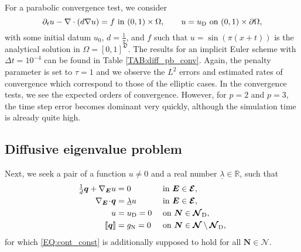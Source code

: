 \documentclass[a4paper, english, 12pt, reqno, draft]{amsart}
\theoremstyle{definition}
\theoremstyle{remark}
\numberwithin{equation}{section}
\newcommand{\SetEdge}{\ensuremath{\boldsymbol{\mathcal E}}}
\newcommand{\SetNode}{\ensuremath{\boldsymbol{\mathcal N}}}
\newcommand{\SetNodeDir}{\ensuremath{\SetNode_\textup D}}
\newcommand{\Edge}{{\ensuremath{\boldsymbol E}}}
\newcommand{\Node}{{\ensuremath{\boldsymbol N}}}
\newcommand{\globDim}{\ensuremath{\mathfrak D}}
\newcommand{\Nabla}{\ensuremath{\nabla_\Edge}}
\newcommand{\Div}{\ensuremath{\Nabla\!\cdot\!}}
\newcommand{\jump}[1]{{[\![ #1 ]\!]}}
\newcommand{\IR}{\ensuremath{\mathbb R}}
\renewcommand{\vec}[1]{\ensuremath{\boldsymbol{#1}}}
\newcommand{\eigenval}{\ensuremath{\underline \lambda}}
\begin{document}
% 
For a parabolic convergence test, we consider
% 
\begin{equation}
 \partial_t u - \nabla \cdot (d \nabla u) = f \text{ in } (0,1) \times \Omega, \qquad u = u_\text D \text{ on } (0,1) \times \partial \Omega,
\end{equation}
% 
with some initial datum $u_0$, $d = \tfrac{1}{\pi}$, and $f$ such that $u = \sin(\pi(x + t))$ is the analytical solution in $\Omega = [0,1]^\globDim$. The results for an implicit Euler scheme with $\Delta t = 10^{-4}$ can be found in Table \ref{TAB:diff_pb_conv}. Again, the penalty parameter is set to $\tau = 1$ and we observe the $L^2$ errors and estimated rates of convergence which correspond to those of the elliptic cases. In the convergence tests, we see the expected orders of convergence. However, for $p=2$ and $p=3$, the time step  error becomes dominant very quickly, although the simulation time is already quite high.
% 
\subsection{Diffusive eigenvalue problem}\label{SEC:diff_eigen}
% 
Next, we seek a pair of a function  $u \neq 0$ and a real number $\eigenval \in \IR$, such that
% 
\begin{subequations}\label{EQ:diffusion_eigen}
\begin{align}
 \tfrac{1}{d} \vec q + \Nabla u & = 0 && \text{ in } \Edge \in \SetEdge,\\
 \Div \vec q & = \eigenval u && \text{ in } \Edge \in \SetEdge,\\
  u & = u_\textup D = 0 && \text{ on } \Node \in \SetNodeDir,\\
 \jump{\vec q} & = g_\textup N = 0 && \text{ on } \Node \in \SetNode \setminus \SetNodeDir,
\end{align}
\end{subequations}
% 
for which \eqref{EQ:cont_const} is additionally supposed to hold for all $\Node \in \SetNode$.
\end{document}
